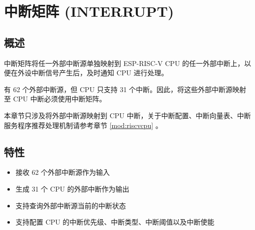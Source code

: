 \documentclass[main\_\_CN.tex]{subfiles}
\begin{document}

\ifglobal
\else
    {\let\clearpage\relax \listoftodos}
    \tableofcontents
\fi




\hypertarget{intmtrx}{}
\chapter{中断矩阵 (INTERRUPT)}
\label{mod:intmtrx}



\section{概述}

\chipname{} 中断矩阵将任一外部中断源单独映射到 ESP-RISC-V CPU 的任一外部中断上，以便在外设中断信号产生后，及时通知 CPU 进行处理。

\chipname{} 有 62 个外部中断源，但 CPU 只支持 31 个中断。因此，将这些外部中断源映射至 CPU 中断必须使用中断矩阵。

\begin{tiplisting}
本章节只涉及将外部中断源映射到 CPU 中断，关于中断配置、中断向量表、中断服务程序推荐处理机制请参考章节 \ref{mod:riscvcpu} \textit{}。
\end{tiplisting}

\section{特性}

\begin{itemize}
    \item 接收 62 个外部中断源作为输入
    \item 生成 31 个 CPU 的外部中断作为输出
    \item 支持查询外部中断源当前的中断状态
    \item 支持配置 CPU 的中断优先级、中断类型、中断阈值以及中断使能
\end{itemize}
\end{document}
